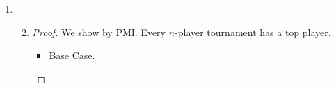 \documentclass[12pt,letterpaper]{article}
\begin{document}
\begin{enumerate}
\begin{enumerate}
\begin{enumerate}
\begin{proof}
\begin{itemize}
                    \begin{align*}
                      \sqrt{n} &< \frac{1}{\sqrt{1}} + \frac{1}{\sqrt{2}} + \dots + \frac{1}{\sqrt{n}} \\
                      \sqrt{n}\left(\sqrt{n}\right) &< \sqrt{n}\left(\frac{1}{\sqrt{1}} + \frac{1}{\sqrt{2}} + \dots + \frac{1}{\sqrt{n}}\right) \\
                      n &< \sqrt{n}\left(\frac{1}{\sqrt{1}} + \frac{1}{\sqrt{2}} + \dots + \frac{1}{\sqrt{n}}\right) \\
                      n &< \sqrt{n + 1}\left(\frac{1}{\sqrt{1}} + \frac{1}{\sqrt{2}} + \dots + \frac{1}{\sqrt{n}}\right) \\
                      n + 1 &< \sqrt{n + 1}\left(\frac{1}{\sqrt{1}} + \frac{1}{\sqrt{2}} + \dots + \frac{1}{\sqrt{n}}\right) + 1 \\
                      n + 1 &< \sqrt{n + 1}\left(\frac{1}{\sqrt{1}} + \frac{1}{\sqrt{2}} + \dots + \frac{1}{\sqrt{n}}\right) + \frac{\sqrt{n + 1}}{\sqrt{n + 1}} \\
                      n + 1 &< \sqrt{n + 1}\left(\frac{1}{\sqrt{1}} + \frac{1}{\sqrt{2}} + \dots + \frac{1}{\sqrt{n}} + \frac{1}{\sqrt{n + 1}}\right) \\
                      \sqrt{n + 1}\left(\sqrt{n + 1}\right) &< \sqrt{n + 1}\left(\frac{1}{\sqrt{1}} + \frac{1}{\sqrt{2}} + \dots + \frac{1}{\sqrt{n}} + \frac{1}{\sqrt{n + 1}}\right) \\
                      \sqrt{n + 1} &< \frac{1}{\sqrt{1}} + \frac{1}{\sqrt{2}} + \dots + \frac{1}{\sqrt{n}} + \frac{1}{\sqrt{n + 1}} \\
                    \end{align*}

                  \item
                    From the Base case and the inductive case,
                    we use the Generalized PMI to state:

                    $\sqrt{n} < \frac{1}{\sqrt{1}} + \frac{1}{\sqrt{2}} + \dots + \frac{1}{\sqrt{n}}$, for $n \geq 2$.
                \end{itemize}
              \end{proof}
          \end{enumerate}
        \setcounter{enumii}{11}
        \item
          \begin{enumerate}
            \setcounter{enumiii}{1}
            \item
              \begin{proof}
                We show by PMI.
                Every $n$-player tournament has a top player.
                \begin{itemize}
                  \item Base Case.


\end{itemize}
\end{proof}
\end{enumerate}
\end{enumerate}
\end{enumerate}
\end{document}
